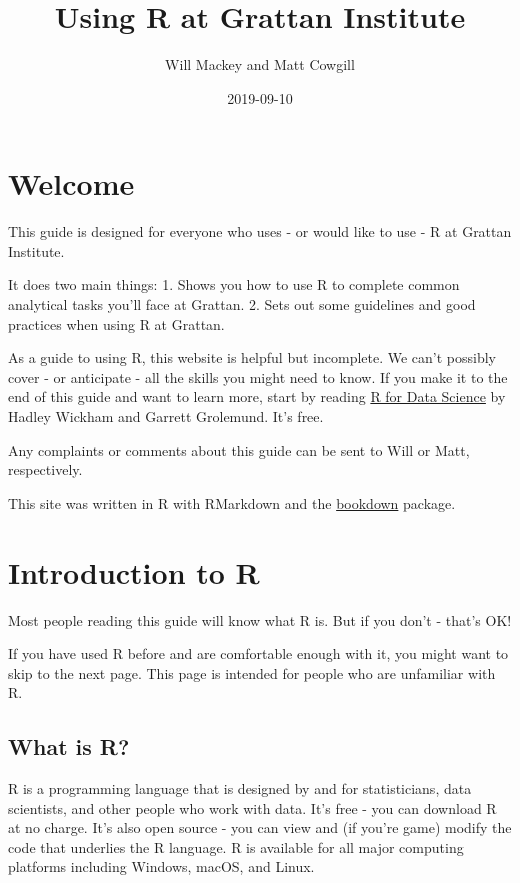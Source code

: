 \documentclass[]{book}
\title{Using R at Grattan Institute}
\author{Will Mackey and Matt Cowgill}
\date{2019-09-10}
\begin{document}
\maketitle

{
\setcounter{tocdepth}{1}
\tableofcontents
}
\hypertarget{welcome}{%
\chapter*{Welcome}\label{welcome}}

This guide is designed for everyone who uses - or would like to use - R at Grattan Institute.

It does two main things:
1. Shows you how to use R to complete common analytical tasks you'll face at Grattan.
2. Sets out some guidelines and good practices when using R at Grattan.

As a guide to using R, this website is helpful but incomplete. We can't possibly cover - or anticipate - all the skills you might need to know. If you make it to the end of this guide and want to learn more, start by reading \href{https://r4ds.had.co.nz}{R for Data Science} by Hadley Wickham and Garrett Grolemund. It's free.

Any complaints or comments about this guide can be sent to Will or Matt, respectively.

This site was written in R with RMarkdown and the \href{https://bookdown.org}{bookdown} package.

\hypertarget{introduction-to-r}{%
\chapter{Introduction to R}\label{introduction-to-r}}

Most people reading this guide will know what R is. But if you don't - that's OK!

If you have used R before and are comfortable enough with it, you might want to skip to the next page. This page is intended for people who are unfamiliar with R.

\hypertarget{what-is-r}{%
\section{What is R?}\label{what-is-r}}

R is a programming language that is designed by and for statisticians, data scientists, and other people who work with data. It's free - you can download R at no charge. It's also open source - you can view and (if you're game) modify the code that underlies the R language. R is available for all major computing platforms including Windows, macOS, and Linux.
\end{document}
